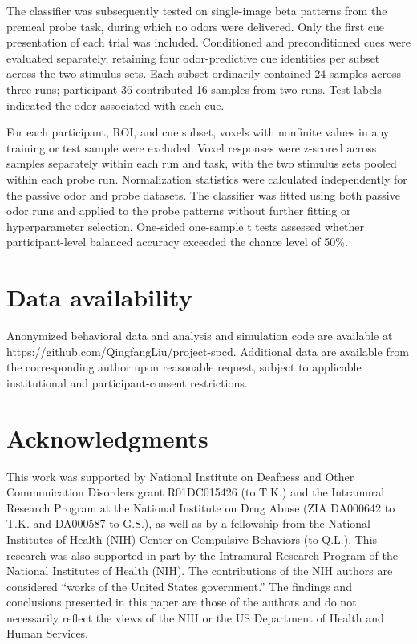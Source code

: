 \documentclass[12pt,letterpaper]{article}
\begin{document}
The classifier was subsequently tested on single-image beta patterns from the premeal probe task, during which no odors were delivered. Only the first cue presentation of each trial was included. Conditioned and preconditioned cues were evaluated separately, retaining four odor-predictive cue identities per subset across the two stimulus sets. Each subset ordinarily contained 24 samples across three runs; participant 36 contributed 16 samples from two runs. Test labels indicated the odor associated with each cue.

For each participant, ROI, and cue subset, voxels with nonfinite values in any training or test sample were excluded. Voxel responses were z-scored across samples separately within each run and task, with the two stimulus sets pooled within each probe run. Normalization statistics were calculated independently for the passive odor and probe datasets. The classifier was fitted using both passive odor runs and applied to the probe patterns without further fitting or hyperparameter selection. One-sided one-sample t tests assessed whether participant-level balanced accuracy exceeded the chance level of 50\%.











\section*{Data availability}
Anonymized behavioral data and analysis and simulation code are available at https://github.com/QingfangLiu/project-spcd. Additional data are available from the corresponding author upon reasonable request, subject to applicable institutional and participant-consent restrictions.




\section*{Acknowledgments}
This work was supported by National Institute on Deafness and Other Communication Disorders grant R01DC015426 (to T.K.) and the Intramural Research Program at the National Institute on Drug Abuse (ZIA DA000642 to T.K. and DA000587 to G.S.), as well as by a fellowship from the National Institutes of Health (NIH) Center on Compulsive Behaviors (to Q.L.). This research was also supported in part by the Intramural Research Program of the National Institutes of Health (NIH). The contributions of the NIH authors are considered “works of the United States government.” The findings and conclusions presented in this paper are those of the authors and do not necessarily reflect the views of the NIH or the US Department of Health and Human Services.











\end{document}
